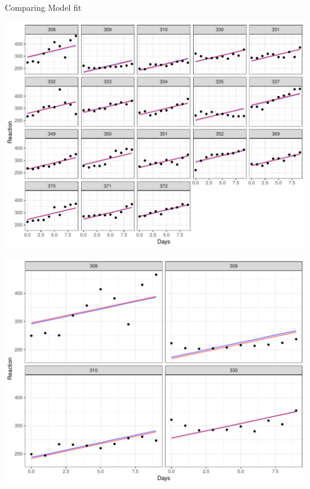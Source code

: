 \documentclass[11pt,ignorenonframetext,]{beamer}
\begin{document}
\begin{frame}{Comparing Model fit}

\includegraphics{Lec5_files/figure-beamer/unnamed-chunk-23-1.pdf}

\end{frame}

\begin{frame}{}

\includegraphics{Lec5_files/figure-beamer/unnamed-chunk-24-1.pdf}

\end{frame}
\end{document}
